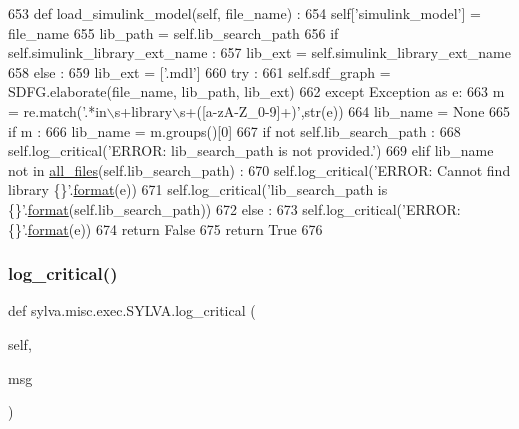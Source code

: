 \begin{DoxyCode}
653   \textcolor{keyword}{def }load\_simulink\_model(self, file\_name) :
654     self[\textcolor{stringliteral}{'simulink\_model'}] = file\_name
655     lib\_path = self.lib\_search\_path
656     \textcolor{keywordflow}{if} self.simulink\_library\_ext\_name :
657       lib\_ext = self.simulink\_library\_ext\_name
658     \textcolor{keywordflow}{else} :
659       lib\_ext = [\textcolor{stringliteral}{'.mdl'}]
660     \textcolor{keywordflow}{try} :
661       self.sdf\_graph = SDFG.elaborate(file\_name, lib\_path, lib\_ext)
662     \textcolor{keywordflow}{except} Exception \textcolor{keyword}{as} e:
663       m = re.match(\textcolor{stringliteral}{'.*in\(\backslash\)s+library\(\backslash\)s+([a-zA-Z\_0-9]+)'},str(e))
664       lib\_name = \textcolor{keywordtype}{None}
665       \textcolor{keywordflow}{if} m :
666         lib\_name = m.groups()[0]
667       \textcolor{keywordflow}{if} \textcolor{keywordflow}{not} self.lib\_search\_path :
668         self.log\_critical(\textcolor{stringliteral}{'ERROR: lib\_search\_path is not provided.'})
669       \textcolor{keywordflow}{elif} lib\_name \textcolor{keywordflow}{not} \textcolor{keywordflow}{in} \hyperlink{namespacesylva_1_1misc_1_1util_a5dfe1979a130725652883d277a24ee5d}{all\_files}(self.lib\_search\_path) :
670         self.log\_critical(\textcolor{stringliteral}{'ERROR: Cannot find library \{\}'}.\hyperlink{namespacesylva_1_1examples_1_1hsdfg_ab3510a0b8457362330aa4d9fd2209590}{format}(e))
671         self.log\_critical(\textcolor{stringliteral}{'lib\_search\_path is \{\}'}.\hyperlink{namespacesylva_1_1examples_1_1hsdfg_ab3510a0b8457362330aa4d9fd2209590}{format}(self.lib\_search\_path))
672       \textcolor{keywordflow}{else} :
673         self.log\_critical(\textcolor{stringliteral}{'ERROR: \{\}'}.\hyperlink{namespacesylva_1_1examples_1_1hsdfg_ab3510a0b8457362330aa4d9fd2209590}{format}(e))
674       \textcolor{keywordflow}{return} \textcolor{keyword}{False}
675     \textcolor{keywordflow}{return} \textcolor{keyword}{True}
676 
\end{DoxyCode}
\mbox{\label{classsylva_1_1misc_1_1exec_1_1_s_y_l_v_a_a1eb3697e042c8566d384d6f4d134a94c}} 
\subsubsection{\texorpdfstring{log\+\_\+critical()}{log\_critical()}}
{\footnotesize\ttfamily def sylva.\+misc.\+exec.\+S\+Y\+L\+V\+A.\+log\+\_\+critical (\begin{DoxyParamCaption}\item[{}]{self,  }\item[{}]{msg }\end{DoxyParamCaption})}



